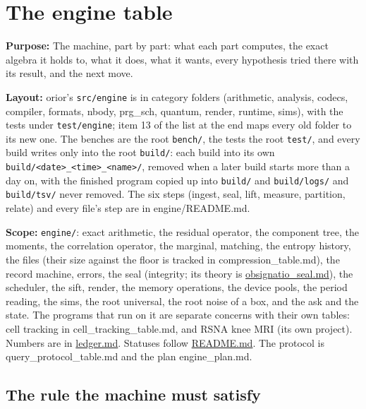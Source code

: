 \chapter{\texorpdfstring{The engine table}{The engine table}}
\label{chap:engine-table}

\textbf{Purpose:} The machine, part by part: what each part computes, the exact algebra it holds to, what it does, what it wants, every hypothesis tried there with its result, and the next move.

\textbf{Layout:} orior's \texttt{src/\allowbreak{}engine} is in category folders (arithmetic, analysis, codecs, compiler, formats, nbody, prg\_\allowbreak{}sch, quantum, render, runtime, sims), with the tests under \texttt{test/\allowbreak{}engine}; item 13 of the list at the end maps every old folder to its new one. The benches are the root \texttt{bench/\allowbreak{}}, the tests the root \texttt{test/\allowbreak{}}, and every build writes only into the root \texttt{build/\allowbreak{}}: each build into its own \texttt{build/\allowbreak{}<date>\_\allowbreak{}<time>\_\allowbreak{}<name>/\allowbreak{}}, removed when a later build starts more than a day on, with the finished program copied up into \texttt{build/\allowbreak{}} and \texttt{build/\allowbreak{}logs/\allowbreak{}} and \texttt{build/\allowbreak{}tsv/\allowbreak{}} never removed. The six steps (ingest, seal, lift, measure, partition, relate) and every file's step are in engine/README.md.

\textbf{Scope:} \texttt{engine/\allowbreak{}}: exact arithmetic, the residual operator, the component tree, the moments, the correlation operator, the marginal, matching, the entropy history, the files (their size against the floor is tracked in compression\_\allowbreak{}table.md), the record machine, errors, the seal (integrity; its theory is \hyperref[chap:obsignatio-seal]{obsignatio\_\allowbreak{}seal.md}), the scheduler, the sift, render, the memory operations, the device pools, the period reading, the sims, the root universal, the root noise of a box, and the ask and the state. The programs that run on it are separate concerns with their own tables: cell tracking in cell\_\allowbreak{}tracking\_\allowbreak{}table.md, and RSNA knee MRI (its own project). Numbers are in \hyperref[chap:ledger]{ledger.md}. Statuses follow \hyperref[chap:readme]{README.md}. The protocol is query\_\allowbreak{}protocol\_\allowbreak{}table.md and the plan engine\_\allowbreak{}plan.md.

\section{\texorpdfstring{The rule the machine must satisfy}{The rule the machine must satisfy}}


